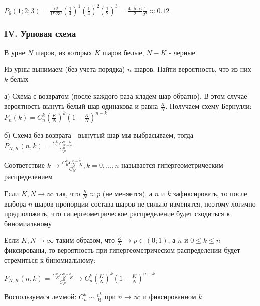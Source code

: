 \documentclass[12pt]{article}
\begin{document}
    $P_6(1; 2; 3) = \frac{6!}{1!2!3!} \left(\frac{1}{4}\right)^1 \left(\frac{1}{4}\right)^2 \left(\frac{1}{2}\right)^3 = \frac{4 \cdot 5 \cdot 6}{2} \frac{1}{2^9} \approx 0.12$

    \hypertarget{urnschema}{}

    \subsubsection{IV. Урновая схема}

    В урне $N$ шаров, из которых $K$ шаров белые, $N - K$ - черные

    Из урны вынимаем (без учета порядка) $n$ шаров. Найти вероятность, что из них $k$ белых

    а) Схема с возвратом (после каждого раза кладем шар обратно). В этом случае вероятность вынуть белый шар одинакова и
    равна $\frac{K}{N}$. Получаем схему Бернулли: $P_n(k) = C^k_n \left(\frac{K}{N}\right)^k \left(1 - \frac{K}{N}\right)^{n - k}$

    б) Схема без возврата - вынутый шар мы выбрасываем, тогда
    $P_{N, K} (n, k) = \frac{C^k_K C^{n - k}_{N - K}}{C^n_N}$

    \hypertarget{hypergeometricdistribution}{}

    \Def Соответствие $k \rightarrow \frac{C^k_K C^{n - k}_{N - K}}{C^n_N}, k = 0, \dots, n$ называется гипергеометрическим
    распределением

    \Nota Если $K, N \to \infty$ так, что $\frac{K}{N} \approx p$ (не меняется), а $n$ и $k$ зафиксировать, то после выбора
    $n$ шаров пропорции состава шаров не сильно изменятся, поэтому логично предположить, что гипергеометрическое распределение
    будет сходиться к биномиальному

    \hypertarget{hypergeometricasimptotic}{}

    \begin{MyTheorem}
        \Ths Если $K, N \to \infty$ таким образом, что $\frac{K}{N} \to p \in (0;1)$, а $n$ и $0 \leq k \leq n$ фиксированы, то
        вероятность при гипергеометрическом распределении будет стремиться к биномиальному:

        $P_{N,K} (n, k) = \frac{C^k_K C^{n - k}_{N - K}}{C^n_N} \rightarrow C^k_n \left(\frac{K}{N}\right)^k \left(1 - \frac{K}{N}\right)^{n - k}$
    \end{MyTheorem}

    Воспользуемся леммой: $C^k_n \sim \frac{n^k}{k!}$ при $n \to \infty$ и фиксированном $k$
\end{document}
